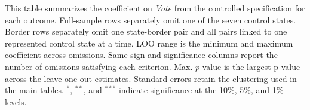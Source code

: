 \begin{table}[H]\centering
\caption{\textbf{Leave-one-out sensitivity summary}}
\label{tab:leave_one_out_summary}
\parbox{\textwidth}{This table summarizes the coefficient on \textit{Vote} from the controlled specification for each outcome. Full-sample rows separately omit one of the seven control states. Border rows separately omit one state-border pair and all pairs linked to one represented control state at a time. LOO range is the minimum and maximum coefficient across omissions. Same sign and significance columns report the number of omissions satisfying each criterion. Max. $p$-value is the largest p-value across the leave-one-out estimates. Standard errors retain the clustering used in the main tables. $^{*}$, $^{**}$, and $^{***}$ indicate significance at the 10\%, 5\%, and 1\% levels.}
\end{table}

